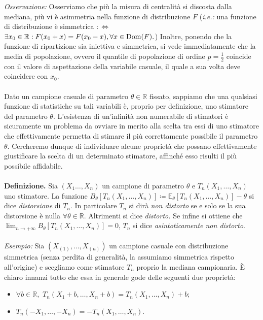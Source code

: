 \textit{Osservazione:} Osserviamo che più la misura di centralità si discosta dalla mediana, più vi è asimmetria nella funzione di distribuzione $F$ (\textit{i.e.:} una funzione di distribuzione è simmetrica $:\Longleftrightarrow$ $\exists x_0\in \mathbb{R}:F(x_0+x)=F(x_0-x), \forall x\in \operatorname{Dom}(F).$) Inoltre, ponendo che la funzione di ripartizione sia iniettiva e simmetrica, si vede immediatamente che la media di popolazione, ovvero il quantile di popolazione di ordine $p=\frac{1}{2}$ coincide con il valore di aspettazione della variabile casuale, il quale a sua volta deve coincidere con $x_0$. \\ \\
Dato un campione casuale di parametro $\theta\in \mathbb{R}$ fissato, sappiamo che una qualsiasi funzione di statistiche su tali variabili è, proprio per definizione, uno stimatore del parametro $\theta$. L'esistenza di un'infinità non numerabile di stimatori è sicuramente un problema da ovviare in merito alla scelta tra essi di uno stimatore che effettivamente permetta di stimare il più correttamente possibile il parametro $\theta$. Cercheremo dunque di individuare alcune proprietà che possano effettivamente giustificare la scelta di un determinato stimatore, affinché esso risulti il più possibile affidabile.\\ \\
\textbf{Definizione.} Sia $(X_1\ldots,X_n)$ un campione di parametro $\theta$ e $T_n(X_1,\ldots,X_n)$ uno stimatore. La funzione $B_{\theta}[T_n(X_1,\ldots,X_n)]\coloneqq \mathbb{E}_{\theta}[T_n(X_1,\ldots,X_n)]-\theta$ si dice \textit{distorsione} di $T_n$. In particolare $T_n$ si dirà \textit{non distorto} se e solo se la sua distorsione è nulla $\forall \theta\in \mathbb{R}$. Altrimenti si dice \textit{distorto.} Se infine si ottiene che $\lim_{n\rightarrow +\infty} B_{\theta}[T_n(X_1,\ldots,X_n)]=0$, $T_n$ si dice \textit{asintoticamente non distorto}.
\\ \\
\textit{Esempio:} Sia $(X_{(1)},\ldots,X_{(n)})$ un campione casuale con distribuzione simmetrica (senza perdita di generalità, la assumiamo simmetrica rispetto all'origine) e scegliamo come stimatore $T_n$ proprio la mediana campionaria. È chiaro innanzi tutto che essa in generale gode delle seguenti due proprietà: \begin{itemize}
\item $\forall b\in \mathbb{R}, $ $T_n(X_1+b,\ldots,X_n+b)=T_n(X_1,\ldots,X_n)+b$;
\item $T_n(-X_ 1,\ldots,-X_n)=-T_n(X_1,\ldots,X_n)$.
\end{itemize}
